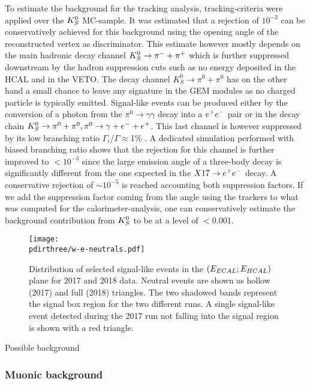 To estimate the background for the tracking analysis, tracking-criteria were applied over the $K^0_S$ MC-sample. It was estimated that a rejection of $10^{-2}$ can be conservatively achieved for this background using the opening angle of the reconstructed vertex as discriminator. This estimate however mostly depends on the main hadronic decay channel $K^0_S \rightarrow \pi^- + \pi^+$ which is further suppressed downstream by the hadron suppression cuts such as no energy deposited in the HCAL and in the VETO. The decay channel $K^0_S \rightarrow \pi^0 + \pi^0$ has on the other hand a small chance to leave any signature in the GEM modules as no charged particle is typically emitted. Signal-like events can be produced either by the conversion of a photon from the $\pi^0 \rightarrow \gamma \gamma$ decay into a $e^+e^-$ pair or in the decay chain $K^0_S \rightarrow \pi^0 + \pi^0, \pi^0 \rightarrow \gamma + e^- + e^+$. This last channel is however suppressed by its low branching ratio $\Gamma_i$/$\Gamma \approx $1\% \cite{review-particle-physics}. A dedicated simulation performed with biased branching ratio shows that the rejection for this channel is further improved to $< 10^{-3}$ since the large emission angle of a three-body decay is significantly different from the one expected in the $X17 \rightarrow e^+ e^-$ decay. A conservative rejection of $\sim 10^{-5}$ is reached accounting both suppression factors. If we add the suppression factor coming from the angle using the trackers to what was computed for the calorimeter-analysis, one can conservatively estimate the background contribution from $K^0_S$ to be at a level of $<0.001$.


\begin{figure}[bth!]
  \centering
  \texttt{[image: \\pdirthree/w-e-neutrals.pdf]}
  \caption[neutral events in visible mode]{Distribution of selected signal-like events in the $(E_{ECAL};E_{HCAL})$ plane for 2017 and 2018 data. Neutral events are shown as hollow (2017) and full (2018) triangles. The two shadowed bands represent the signal box region for the two different runs. A single signal-like event detected during the 2017 run not falling into the signal region is shown with a red triangle.}
  \label{fig:w-e-vis}
\end{figure}

Possible background 

\subsubsection{Muonic background}
\label{ch3:sec:bkg:vis:muon}

